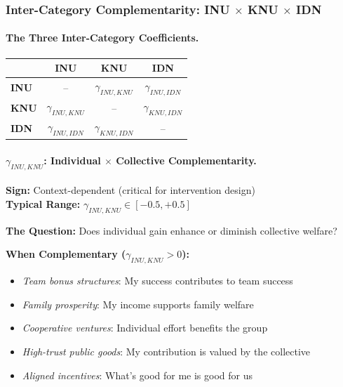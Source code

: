 \subsubsection{Inter-Category Complementarity: INU $\times$ KNU $\times$ IDN}
\label{sec:inter-category}

\paragraph{The Three Inter-Category Coefficients.}

\begin{center}
\renewcommand{\arraystretch}{1.4}
\begin{tabular}{|l|c|c|c|}
\hline
& \textbf{INU} & \textbf{KNU} & \textbf{IDN} \\
\hline
\textbf{INU} & -- & $\gamma_{INU,KNU}$ & $\gamma_{INU,IDN}$ \\
\textbf{KNU} & $\gamma_{INU,KNU}$ & -- & $\gamma_{KNU,IDN}$ \\
\textbf{IDN} & $\gamma_{INU,IDN}$ & $\gamma_{KNU,IDN}$ & -- \\
\hline
\end{tabular}
\end{center}


\paragraph{$\gamma_{INU,KNU}$: Individual $\times$ Collective Complementarity.}

\begin{tcolorbox}[colback=yellow!5, colframe=yellow!50!black]
\textbf{Sign:} Context-dependent (critical for intervention design) \\
\textbf{Typical Range:} $\gamma_{INU,KNU} \in [-0.5, +0.5]$
\end{tcolorbox}

\textbf{The Question:} Does individual gain enhance or diminish collective welfare?

\textbf{When Complementary ($\gamma_{INU,KNU} > 0$):}
\begin{itemize}
    \item \textit{Team bonus structures}: My success contributes to team success
    \item \textit{Family prosperity}: My income supports family welfare
    \item \textit{Cooperative ventures}: Individual effort benefits the group
    \item \textit{High-trust public goods}: My contribution is valued by the collective
    \item \textit{Aligned incentives}: What's good for me is good for us
\end{itemize}

